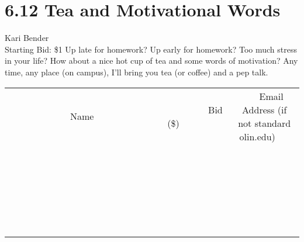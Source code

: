 \documentclass[11pt]{article}
\begin{document}
\section*{6.12 Tea and Motivational Words}
Kari Bender
\\
Starting Bid: \$1
\newline
Up late for homework? Up early for homework? Too much stress in your life? How about a nice hot cup of tea and some words of motivation? Any time, any place (on campus), I'll bring you tea (or coffee) and a pep talk.
\\[6ex]
\begin{tabular}{c c c}
~~~~~~~~~~~~~Name~~~~~~~~~~~~~ & ~~~~~~~~~Bid (\$)~~~~~~~~~  & ~~~Email Address (if not standard olin.edu)~~~\\
 & & \\
\hline
 & & \\
\hline
 & & \\
\hline
 & & \\
\hline
 & & \\
\hline
 & & \\
\hline
 & & \\
\hline
 & & \\
\hline
 & & \\
\hline
 & & \\
\hline
 & & \\
\hline
 & & \\
\hline
 & & \\
\hline
 & & \\
\hline
 & & \\
\hline
 & & \\
\hline
 & & \\
\hline
 & & \\
\hline
 & & \\
\hline
 & & \\
\hline
 & & \\
\hline
 & & \\
\hline
 & & \\
\hline
 & & \\
\hline
 & & \\
\hline
 & & \\
\hline
\end{tabular}
\newpage
\end{document}
